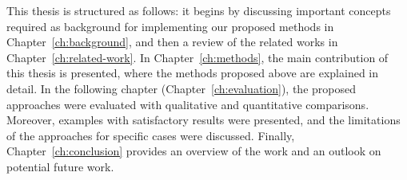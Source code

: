 This thesis is structured as follows: it begins by discussing important concepts required as background for implementing our proposed methods in Chapter~\ref{ch:background}, and then a review of the related works in Chapter~\ref{ch:related-work}. In Chapter~\ref{ch:methods}, the main contribution of this thesis is presented, where the methods proposed above are explained in detail. In the following chapter (Chapter~\ref{ch:evaluation}), the proposed approaches were evaluated with qualitative and quantitative comparisons. Moreover, examples with satisfactory results were presented, and the limitations of the approaches for specific cases were discussed. Finally, Chapter~\ref{ch:conclusion} provides an overview of the work and an outlook on potential future work.